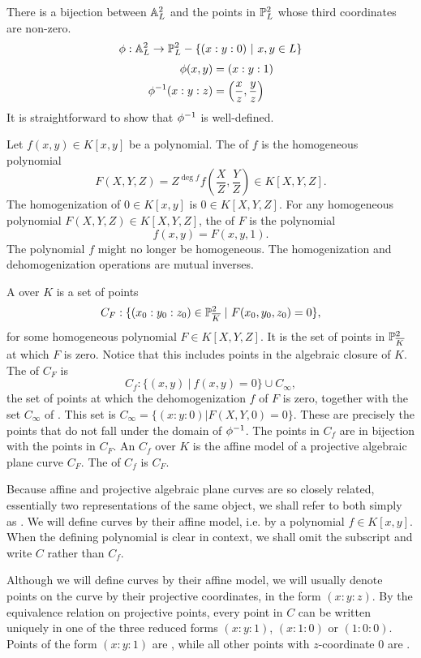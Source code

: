 There is a bijection between $\mathbb{A}_L^2$ and the points in $\mathbb{P}_L^2$ whose third coordinates are non-zero.
\[ \phi : \mathbb{A}_L^2 \to \mathbb{P}_L^2 - \{ (x:y:0) ~|~ x, y \in L \} \]
\begin{align*}
  \phi(x, y) &= (x : y : 1) \\
  \phi^{-1}(x : y : z) &= \left( \frac x z, \frac y z \right)
\end{align*}
It is straightforward to show that $\phi^{-1}$ is well-defined.

Let $f(x,y) \in K[x,y]$ be a polynomial.
The  of $f$ is the homogeneous polynomial
\[ F(X,Y,Z) = Z^{\deg f} f\left( \frac X Z, \frac Y Z \right) \in K[X,Y,Z]. \]
The homogenization of $0 \in K[x,y]$ is $0 \in K[X,Y,Z]$.
For any homogeneous polynomial $F(X,Y,Z) \in K[X,Y,Z]$,
the  of $F$ is the polynomial
\[ f(x,y) = F(x, y, 1). \]
The polynomial $f$ might no longer be homogeneous.
The homogenization and dehomogenization operations are mutual inverses.

A  over $K$ is a set of points
\[ C_F : \{ (x_0 : y_0 : z_0) \in \mathbb{P}_{\overline K}^2 ~|~ F(x_0, y_0, z_0) = 0 \}, \]
for some homogeneous polynomial $F \in K[X, Y, Z]$.
It is the set of points in $\mathbb{P}_{\overline K}^2$ at which $F$ is zero.
Notice that this includes points in the algebraic closure of $K$.
The  of $C_F$ is
\[ C_f : \{ (x, y) ~|~ f(x,y) = 0 \} \cup C_\infty, \]
the set of points at which the dehomogenization $f$ of $F$ is zero,
together with the set $C_\infty$ of .
This set is $C_\infty = \{ (x:y:0) | F(X,Y,0) = 0 \}$.
These are precisely the points that do not fall under the domain of $\phi^{-1}$.
The points in $C_f$ are in bijection with the points in $C_F$.
An  $C_f$ over $K$
is the affine model of a projective algebraic plane curve $C_F$.
The  of $C_f$ is $C_F$.

Because affine and projective algebraic plane curves are so closely related,
essentially two representations of the same object,
we shall refer to both simply as .
We will define curves by their affine model, i.e. by a polynomial $f \in K[x,y]$.
When the defining polynomial is clear in context, we shall omit the subscript and write $C$ rather than $C_f$.

Although we will define curves by their affine model,
we will usually denote points on the curve by their projective coordinates, in the form $(x:y:z)$.
By the equivalence relation on projective points,
every point in $C$ can be written uniquely in one of the three reduced forms $(x:y:1)$, $(x:1:0)$ or $(1:0:0)$.
Points of the form $(x:y:1)$ are ,
while all other points with $z$-coordinate 0 are .

